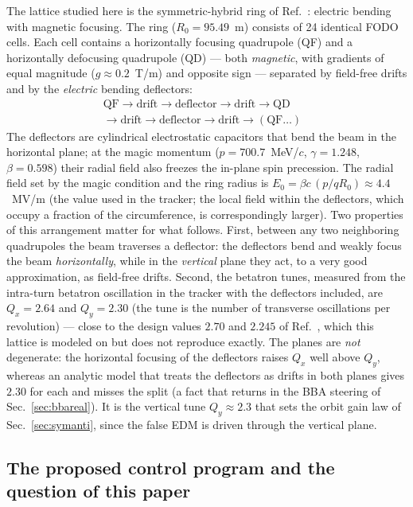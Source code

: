 \documentclass[aps,prab,reprint,superscriptaddress,nofootinbib]{revtex4-2}
\begin{document}
The lattice studied here is the symmetric-hybrid ring of
Ref.~\cite{omarov}: electric bending with magnetic focusing.  The ring
($R_0 = 95.49$~m) consists of 24 identical FODO cells.  Each cell contains a
horizontally focusing quadrupole (QF) and a horizontally defocusing quadrupole
(QD) --- both \emph{magnetic}, with gradients of equal magnitude
($g \approx 0.2$~T/m) and opposite sign --- separated by field-free drifts and
by the \emph{electric} bending deflectors:
\begin{align*}
  \text{QF} \to \text{drift} \to \text{deflector} \to \text{drift} \to
  \text{QD} & \\
  {} \to \text{drift} \to \text{deflector} \to \text{drift} \to
  (\text{QF}\ldots) &
\end{align*}
The deflectors are cylindrical electrostatic capacitors that bend the beam in
the horizontal plane; at the magic momentum ($p = 700.7$~MeV/$c$, $\gamma =
1.248$, $\beta = 0.598$) their radial field also freezes the in-plane spin
precession.  The radial field set by the magic condition and the ring radius is
$E_0 = \beta c\, (p/qR_0) \approx 4.4$~MV/m (the value used in the tracker; the
local field within the deflectors, which occupy a fraction of the
circumference, is correspondingly larger).  Two properties of this arrangement
matter for what follows.  First, between any two neighboring quadrupoles the
beam traverses a deflector: the deflectors bend and weakly focus the beam
\emph{horizontally}, while in the \emph{vertical} plane they act, to a very good
approximation, as field-free drifts.  Second, the betatron tunes, measured from the intra-turn betatron oscillation
in the tracker with the deflectors included, are $Q_x = 2.64$ and $Q_y = 2.30$
(the tune is the number of transverse oscillations per revolution) --- close to
the design values $2.70$ and $2.245$ of Ref.~\cite{omarov}, which this lattice
is modeled on but does not reproduce exactly.  The planes are \emph{not}
degenerate: the horizontal focusing of the deflectors raises $Q_x$ well above
$Q_y$, whereas an analytic model that treats the deflectors as drifts in both
planes gives $2.30$ for each and misses the split (a fact that returns in the
BBA steering of Sec.~\ref{sec:bbareal}).  It is the vertical tune $Q_y \approx
2.3$ that sets the orbit gain law of Sec.~\ref{sec:symanti}, since the false EDM
is driven through the vertical plane.

\subsection{The proposed control program and the question of this paper}
\label{sec:remedy}
\end{document}
